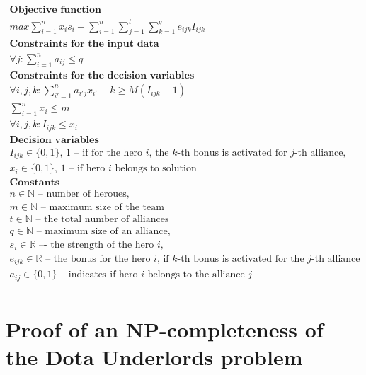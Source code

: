 \documentclass[smallextended]{svjour3}       %
\begin{document}
\begin{equation}
\label{eq:DUIP}
\begin{gathered}
\textbf{Objective function}\\
max \sum_{i=1}^{n} x_i s_i + \sum_{i=1}^{n} \sum_{j=1}^{t}  \sum_{k=1}^{q} e_{ijk} I_{ijk} \\
\textbf{Constraints for the input data}\\
\forall{j} : \sum_{i=1}^n a_{ij} \le q \\
\textbf{Constraints for the decision variables} \\
\forall{i,j,k} :  \sum_{i'=1}^{n} a_{i'j} x_{i'} - k \ge M( I_{ijk}  - 1) \\
\sum_{i=1}^n x_i \le m   \\ 
\forall{i,j,k} :  I_{ijk}  \le x_i \\
\textbf{Decision variables} \\
I_{ijk} \in \{0, 1\} \text {, 1 – if for the hero } i \text{, the } k\text{-th bonus is activated for }  j \text{-th alliance,} \\
x_i  \in \{0, 1\} \text{, 1 -- if hero } i \text{ belongs to solution} \\
\textbf{Constants} \\
n \in \mathbb{N} \text{ -- number of heroues,} \\
m \in \mathbb{N} \text{ -- maximum size of the team}\\
t \in \mathbb{N} \text{ -- the total number of alliances} \\
q \in \mathbb{N} \text{ -- maximum size of an alliance,} \\
s_i  \in \mathbb{R} \text{ –- the strength of the hero } i, \\
e_{ijk} \in \mathbb{R} \text{ -- the bonus for the hero } i \text{,  if } k
\text{-th bonus is activated for the } j \text{-th alliance} \\
a_{ij} \in \{0, 1\} \text{ -- indicates if hero } i \text{ belongs to the alliance } j \\ 
\end{gathered}
\end{equation}

\section{Proof of an NP-completeness of the Dota Underlords problem}
\label{SectionNPCompleteProof}
\end{document}
